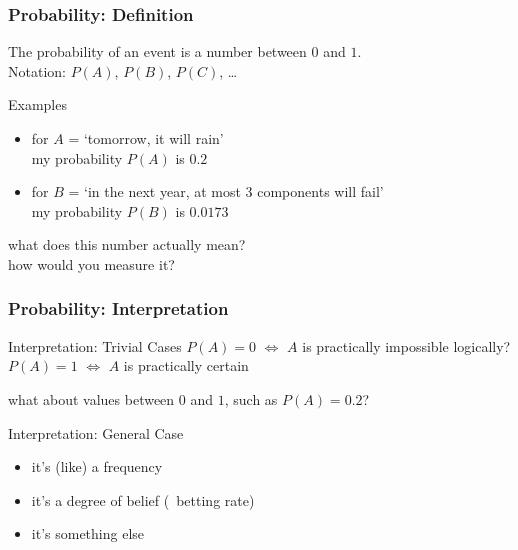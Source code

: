 \documentclass{beamer}
\newcommand{\play}{\structure{$\blacktriangleright$}}
\begin{document}
\begin{frame}
  \frametitle{Probability: Definition}
  \begin{definition}
    The \alert{probability of an event} is a number between $0$ and $1$.
    \\[1ex]
    Notation: $P(A)$, $P(B)$, $P(C)$, \dots
  \end{definition}
  \begin{exampleblock}{Examples}
    \begin{itemize}
    \item for $A$ = `tomorrow, it will rain' \\
      my probability $P(A)$ is $0.2$
    \item for $B$ = `in the next year, at most 3 components will fail' \\
      my probability $P(B)$ is $0.0173$
    \end{itemize}
  \end{exampleblock}
  \begin{alertblock}{}
    what does this number actually mean? \\
    how would you measure it?
  \end{alertblock}
\end{frame}

\begin{frame}
  \frametitle{Probability: Interpretation}
  \begin{block}{Interpretation: Trivial Cases}
    $P(A)=0$ $\iff$ $A$ is practically impossible {\hfill \scriptsize logically?}\\
    $P(A)=1$ $\iff$ $A$ is practically certain
  \end{block}
  \begin{alertblock}{}
    what about values between $0$ and $1$, such as $P(A)=0.2$?
  \end{alertblock}
  \begin{block}{Interpretation: General Case}
    \begin{itemize}
    \item it's (like) a \alert{frequency}
    \item it's a degree of belief (\play\ \alert{betting rate})
    \item it's something else
    \end{itemize}
  \end{block}
\end{frame}
\end{document}
